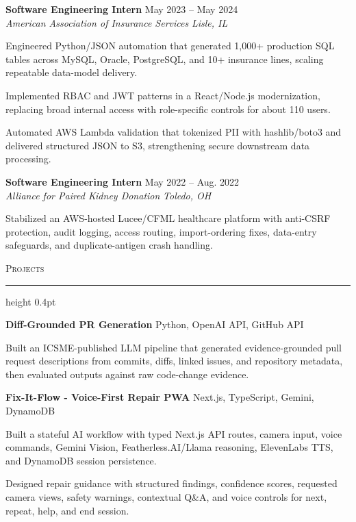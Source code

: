 \documentclass[letterpaper,11pt]{article}
\newcommand{\resumesection}[1]{%
  \par\vspace{2pt}%
  {\large\scshape #1}\par\vspace{2pt}%
  \hrule height 0.4pt\vspace{2pt}%
}
\newcommand{\resumeSubheading}[4]{
  \textbf{#1} \hfill #2\\
  \textit{#3} \hfill \textit{#4}
}
\newcommand{\projectHeading}[2]{
  \textbf{#1} \hfill #2
}
\begin{document}
\resumeSubheading
{Software Engineering Intern}{May 2023 -- May 2024}
{American Association of Insurance Services}{Lisle, IL}
\begin{tightitemize}
  \item Engineered Python/JSON automation that generated 1,000+ production SQL tables across MySQL, Oracle, PostgreSQL, and 10+ insurance lines, scaling repeatable data-model delivery.
  \item Implemented RBAC and JWT patterns in a React/Node.js modernization, replacing broad internal access with role-specific controls for about 110 users.
  \item Automated AWS Lambda validation that tokenized PII with hashlib/boto3 and delivered structured JSON to S3, strengthening secure downstream data processing.
\end{tightitemize}

\resumeSubheading
{Software Engineering Intern}{May 2022 -- Aug. 2022}
{Alliance for Paired Kidney Donation}{Toledo, OH}
\begin{tightitemize}
  \item Stabilized an AWS-hosted Lucee/CFML healthcare platform with anti-CSRF protection, audit logging, access routing, import-ordering fixes, data-entry safeguards, and duplicate-antigen crash handling.
\end{tightitemize}

\resumesection{Projects}
\projectHeading{Diff-Grounded PR Generation}{Python, OpenAI API, GitHub API}
\begin{tightitemize}
  \item Built an ICSME-published LLM pipeline that generated evidence-grounded pull request descriptions from commits, diffs, linked issues, and repository metadata, then evaluated outputs against raw code-change evidence.
\end{tightitemize}

\projectHeading{Fix-It-Flow - Voice-First Repair PWA}{Next.js, TypeScript, Gemini, DynamoDB}
\begin{tightitemize}
  \item Built a stateful AI workflow with typed Next.js API routes, camera input, voice commands, Gemini Vision, Featherless.AI/Llama reasoning, ElevenLabs TTS, and DynamoDB session persistence.
  \item Designed repair guidance with structured findings, confidence scores, requested camera views, safety warnings, contextual Q\&A, and voice controls for next, repeat, help, and end session.
\end{tightitemize}
\end{document}
